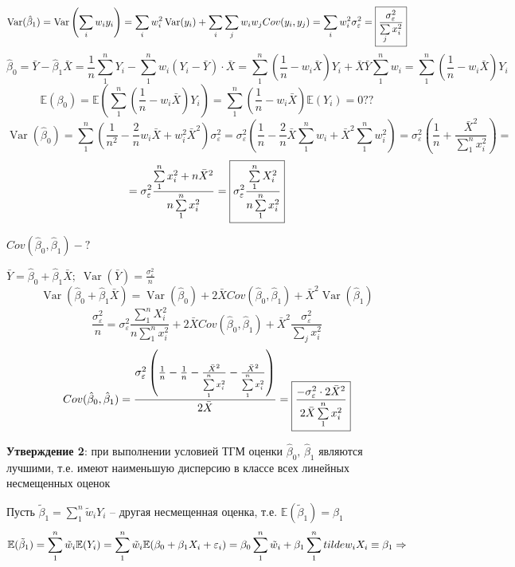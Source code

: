 \documentclass[12pt]{article}
\newcommand{\e}{\mathbb{E}}
\DeclareMathOperator{\var}{Var}
\renewcommand{\epsilon}{\varepsilon}
\newcommand{\msum}{\sum\limits_1^n}
\newcommand{\isum}{\sum\limits_i}
\newcommand{\jsum}{\sum\limits_j}
\begin{document}
$$\var(\hat{\beta}_1) = \var\left(\isum w_i y_i\right) = \isum w_i^2 \var(y_i) + \isum \jsum w_i w_j Cov(y_i, y_j) = \isum w_i^2 \sigma_{\epsilon}^2 = \fbox{\text{$\displaystyle\frac{\sigma_{\epsilon}^2}{\jsum x_i^2}$}}$$
$$\hat{\beta}_0 = \bar{Y} - \hat{\beta}_1 \bar{X} = \frac{1}{n} \msum Y_i - \msum w_i (Y_i - \bar{Y}) \cdot \bar{X} = \msum \left(\frac{1}{n} - w_i \bar{X}\right) Y_i + \bar{X} \bar{Y} \msum w_i = \msum\left(\frac{1}{n} - w_i \bar{X}\right) Y_i$$
$$\e(\beta_0) = \e\left(\msum\left(\frac{1}{n} - w_i \bar{X}\right) Y_i\right) = \msum\left(\frac{1}{n} - w_i \bar{X}\right) \e(Y_i) = 0??$$
$$\var(\hat{\beta}_0) = \msum \left(\frac{1}{n^2} - \frac{2}{n} w_i \bar{X} + w_i^2 \bar{X}^2\right) \sigma_{\epsilon}^2 = \sigma_{\epsilon}^2 \left(\frac{1}{n} - \frac{2}{n} \bar{X} \msum w_i + \bar{X}^2 \msum w_i^2\right) = \sigma_{\epsilon}^2 \left(\frac{1}{n} + \frac{\bar{X}^2}{\msum x_i^2}\right) =$$
$$= \sigma_{\epsilon}^2 \frac{\msum x_i^2 + n \bar{X}^2}{n \msum x_i^2} = \fbox{\text{$\displaystyle\sigma_{\epsilon}^2 \frac{\msum X_i^2}{n \msum x_i^2}$}}$$

$\displaystyle Cov(\hat{\beta}_0, \hat{\beta}_1) - ?$

$\displaystyle\bar{Y} = \hat{\beta}_0 + \hat{\beta}_1 \bar{X}; \; \var(\bar{Y}) = \frac{\sigma_{\epsilon}^2}{n}$
$$\var(\hat{\beta}_0 + \hat{\beta}_1 \bar{X}) = \var(\hat{\beta}_0) + 2 \bar{X} Cov(\hat{\beta}_0, \hat{\beta}_1) + \bar{X}^2 \var(\hat{\beta}_1)$$
$$\frac{\sigma_{\epsilon}^2}{n} = \sigma_{\epsilon}^2 \frac{\msum X_i^2}{n \msum x_i^2} + 2 \bar{X} Cov(\hat{\beta}_0, \hat{\beta}_1) + \bar{X}^2 \frac{\sigma_{\epsilon}^2}{\jsum x_i^2}$$
$$Cov(\hat{\beta}_0, \hat{\beta}_1) = \frac{\sigma_{\epsilon}^2 \left(\frac{1}{n} - \frac{1}{n} -  \frac{\bar{X}^2}{\msum x_i^2} - \frac{\bar{X}^2}{\msum x_i^2}\right)}{2\bar{X}} = \fbox{\text{$\displaystyle\frac{- \sigma_{\epsilon}^2 \cdot 2 \bar{X}^2}{2 \bar{X} \msum x_i^2}$}}$$

\textbf{Утверждение 2}: при выполнении условией ТГМ оценки $\hat{\beta}_0, \, \hat{\beta}_1$ являются лучшими, т.е. имеют наименьшую дисперсию в классе всех линейных несмещенных оценок

Пусть $\tilde{\beta}_1 = \msum \tilde{w}_i Y_i$ -- другая несмещенная оценка, т.е. $\e(\tilde{\beta}_1) = \beta_1$
$$\e(\tilde{\beta}_1) = \msum \tilde{w}_i \e(Y_i) = \msum \tilde{w}_i \e(\beta_0 + \beta_1 X_i + \epsilon_i) = \beta_0 \msum \tilde{w}_i + \beta_1 \msum \\tilde{w}_i X_i \equiv \beta_1 \Rightarrow$$
\end{document}
